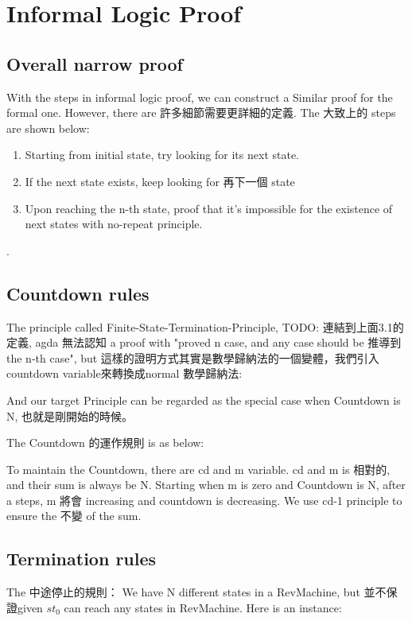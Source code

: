 \section{Informal Logic Proof}

\subsection{ Overall narrow proof }

With the steps in informal logic proof, we can construct a Similar proof for the formal one.  However, there are 許多細節需要更詳細的定義.
The 大致上的 steps are shown below:
\begin{enumerate}[1.]
\item Starting from initial state, try looking for its next state. 
\item If the next state exists, keep looking for 再下一個 state
\item Upon reaching the n-th state, proof that it's impossible for the existence of next states with no-repeat principle.
\end{enumerate}.

\subsection{ Countdown rules }
The principle called Finite-State-Termination-Principle, {TODO: 連結到上面3.1的定義}, agda 無法認知 a proof with "proved n case, and any case should be 推導到 the n-th case", but 這樣的證明方式其實是數學歸納法的一個變體，我們引入countdown variable來轉換成normal 數學歸納法:


And our target Principle can be regarded as the special case when Countdown is N, 也就是剛開始的時候。

The Countdown 的運作規則 is as below:


To maintain the Countdown, there are cd and m variable.  cd and m is 相對的, and their sum is always be N.  Starting when m is zero and Countdown is N, after a steps, m 將會 increasing and countdown is decreasing.  We use cd-1 principle to ensure the 不變 of the sum.

\subsection{ Termination rules }
The 中途停止的規則：
We have N different states in a RevMachine, but 並不保證given $st_{0}$ can reach any states in RevMachine.  Here is an instance: 


